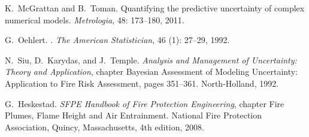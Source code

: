 \documentclass[fleqn,b5paper]{article}
\begin{document}
\begin{thebibliography}{12}
K.~McGrattan and B.~Toman.
\newblock Quantifying the predictive uncertainty of complex numerical models.
\newblock \emph{Metrologia}, 48: 173--180, 2011.

G.~Oehlert.
.
\newblock \emph{The American Statistician}, 46 (1): 27--29,
  1992.

N.~Siu, D.~Karydas, and J.~Temple.
\newblock \emph{{Analysis and Management of Uncertainty: Theory and
  Application}}, chapter {Bayesian Assessment of Modeling Uncertainty:
  Application to Fire Risk Assessment}, pages 351--361.
\newblock North-Holland, 1992.

G.~Heskestad.
\newblock \emph{SFPE Handbook of Fire Protection Engineering}, chapter Fire
  Plumes, Flame Height and Air Entrainment.
\newblock National Fire Protection Association, Quincy, Massachusetts, 4th
  edition, 2008.

\end{thebibliography}
\end{document}
